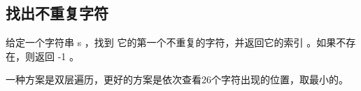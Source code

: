 \documentclass[../../../interview-questions.tex]{subfiles}
\begin{document}
\subsection{找出不重复字符}

给定一个字符串 s ，找到 它的第一个不重复的字符，并返回它的索引 。如果不存在，则返回 -1 。

一种方案是双层遍历，更好的方案是依次查看26个字符出现的位置，取最小的。
\end{document}
